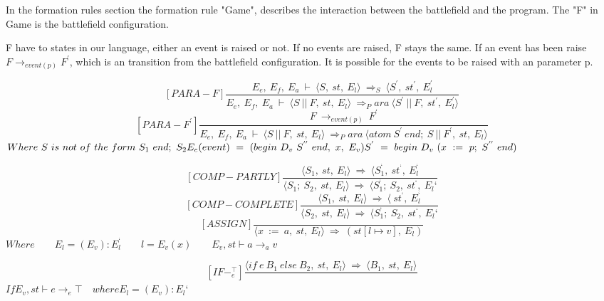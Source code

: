 In the formation rules section the formation rule "Game", describes the interaction between the battlefield and the program. The "F" in Game is the battlefield configuration. 

F have to states in our language, either an event is raised or not. If no events are raised, F stays the same. If an event has been raise \begin{math} F \rightarrow_{event(p)} F^{'} \end{math}, which is an transition from the battlefield configuration. It is possible for the events to be raised with an parameter p. 

\[	
[PARA-F]	
\dfrac{E_e, \ E_f, \ E_a \ \vdash \ \langle S, \ st, \ E_l \rangle \ \Rightarrow_S \ \langle S^{'}, \ st^{'}, \ E_l^{'}}{E_e, \ E_f, \ E_a \ \vdash \ \langle S \ || \ F, \ st, \ E_l \rangle \ \Rightarrow_Para \ \langle S^{'} \ || \ F, \ st^{'}, \ E_l^{'} \rangle}	
\]\newline
\[	
[PARA-F^{'}]	
\dfrac{F \ \rightarrow_{event(p)} \ F^{'}}{E_e, \ E_f, \ E_a \ \vdash \ \langle S \ || \ F, \ st, \ E_l \rangle \ \Rightarrow_Para \ \langle atom \ S^{'} \ end; \ S \ || \ F^{'}, \ st, \ E_l \rangle}	
\]
\begin{math}		
	Where \ S \ is \ not \ of \ the \ form \ S_1 \ end; \ S_2 \newline		
	E_e(event) \ = \ (begin \ D_v \ S^{''} \ end, \ x, \ E_v) \newline		
	S^{'} \ = \ begin \ D_v \ (x \ := \ p; \ S^{''} \ end)		
\end{math}

\[
[COMP-PARTLY]
\dfrac{\langle S_1, \ st, \ E_l \rangle \ \Rightarrow \ \langle S_1^{‘}, \ st^{‘}, \ E_l^{‘}}{\langle S_1; \ S_2, \ st, \ E_l \rangle \ \Rightarrow \ \langle S_1^{‘}; \ S_2, \ st^{‘}, \ E_l{‘}}
\]\newline
\[
[COMP-COMPLETE]
\dfrac{\langle S_1, \ st, \ E_l \rangle \ \Rightarrow \ \langle \ st^{‘}, \ E_l^{‘}}{\langle S_2, \ st, \ E_l \rangle \ \Rightarrow \ \langle S_1^{‘}; \ S_2, \ st^{‘}, \ E_l{‘}}
\]\newline
\[
[ASSIGN]
\dfrac{}{\langle x \ := \ a, \ st, \ E_l \rangle \ \Rightarrow \ (st[l \mapsto v], \ E_l)}
\]
\begin{math}
	Where
	\qquad E_l = (E_v) : E_l^{‘}
	\qquad l = E_v(x)
	\qquad E_v, st \vdash a \rightarrow_a v
\end{math}

\[
[IF-^{\top}_e]
\dfrac{\langle if \ e \ B_1 \ else \ B_2, \ st, \ E_l \rangle \ \Rightarrow \ \langle B_1, \ st, \ E_l \rangle}{}
\]
\begin{math}
	If E_v, st \vdash e \rightarrow_e \top \quad where E_l = (E_v) : E_l{‘}
\end{math}

